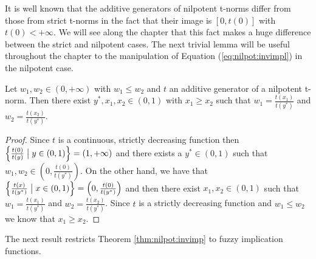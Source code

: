 It is well known that the additive generators of nilpotent t-norms differ from those from strict t-norms in the fact that their image is $[0,t(0)]$ with $t(0)<+\infty$. We will see along the chapter that this fact makes a huge difference between the strict and nilpotent cases. The next trivial lemma will be useful throughout the chapter to the manipulation of Equation  (\ref{eq:nilpot:invimpl}) in the nilpotent case.
\begin{lemma}\label{lem:nilpot:values} 
	Let $w_1,w_2 \in (0,+\infty)$ with $w_1 \leq w_2$ and $t$ an additive generator of a nilpotent t-norm. Then there exist $y^*,x_1,x_2 \in (0,1)$ with $x_1 \geq x_2$ such that $w_1=\frac{t(x_1)}{t(y^*)}$ and $w_2=\frac{t(x_2)}{t(y^*)}$.
\end{lemma}
\begin{proof}
	Since $t$ is a continuous, strictly decreasing function then $\left\lbrace \frac{t(0)}{t(y)} \bigm| y \in (0,1)\right\rbrace = (1,+\infty)$ and there exists a $y^* \in (0,1)$ such that $w_1,w_2 \in \left(0,\frac{t(0)}{t(y^*)}\right)$. On the other hand, we have that $\left\lbrace \frac{t(x)}{t(y^*)} \bigm| x \in (0,1)\right\rbrace = \left(0,\frac{t(0)}{t(y^*)}\right)$ and then there exist $x_1,x_2 \in (0,1)$ such that $w_1=\frac{t(x_1)}{t(y^*)}$ and $w_2=\frac{t(x_2)}{t(y^*)}$. Since $t$ is a strictly decreasing function and $w_1 \leq w_2$ we know that $x_1 \geq x_2$.
\end{proof}

The next result restricts Theorem \ref{thm:nilpot:invimp} to fuzzy implication functions.

